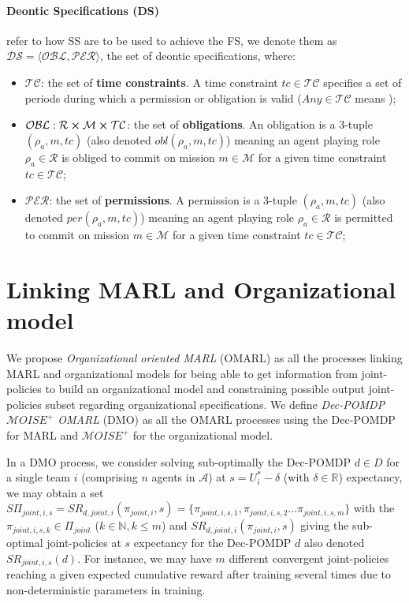 \documentclass[doubleblind]{ecai}
\begin{document}
\paragraph{\textbf{Deontic Specifications (DS)}} refer to how SS are to be used to achieve the FS, we denote them as $\mathcal{DS} = \langle \mathcal{OBL},\mathcal{PER} \rangle$, the set of deontic specifications, where:

\begin{itemize}
    \item $\mathcal{TC}$: the set of \textbf{time constraints}. A time constraint $tc \in \mathcal{TC}$ specifies a set of periods during which a permission or obligation is valid ($Any \in \mathcal{TC}$ means );
    \item $\mathcal{OBL}: \mathcal{R} \cross \mathcal{M} \cross \mathcal{TC}$: the set of \textbf{obligations}. An obligation is a 3-tuple $(\rho_a,m,tc)$ (also denoted $obl(\rho_a,m,tc)$) meaning an agent playing role $\rho_a \in \mathcal{R}$ is obliged to commit on mission $m \in \mathcal{M}$ for a given time constraint $tc \in \mathcal{TC}$;
    \item $\mathcal{PER}$: the set of \textbf{permissions}. A permission is a 3-tuple $(\rho_a,m,tc)$ (also denoted $per(\rho_a,m,tc)$) meaning an agent playing role $\rho_a \in \mathcal{R}$ is permitted to commit on mission $m \in \mathcal{M}$ for a given time constraint $tc \in \mathcal{TC}$;
\end{itemize}


\section{Linking MARL and Organizational model}

We propose \emph{Organizational oriented MARL} (OMARL) as all the processes linking MARL and organizational models for being able to get information from joint-policies to build an organizational model and constraining possible output joint-policies subset regarding organizational specifications. We define \emph{Dec-POMDP $\mathcal{M}OISE^+$ OMARL} (DMO) as all the OMARL processes using the Dec-POMDP for MARL and $\mathcal{M}OISE^+$ for the organizational model.

In a DMO process, we consider solving sub-optimally the Dec-POMDP $d \in D$ for a single team $i$ (comprising $n$ agents in $\mathcal{A}$) at $s = U_i^* - \delta$ (with $\delta \in \mathbb{R}$) expectancy, we may obtain a set $S\Pi_{joint,i,s} = SR_{d,joint,i}(\pi_{joint,i},s) = \{\pi_{joint,i,s,1}, \pi_{joint,i,s,2} ... \pi_{joint,i,s,m}\}$ with the $\pi_{joint,i,s,k} \in \Pi_{joint}$ ($k \in \mathbb{N}, k \leq m$) and $SR_{d,joint,i}(\pi_{joint,i},s)$ giving the sub-optimal joint-policies at $s$ expectancy for the Dec-POMDP $d$ also denoted $SR_{joint,i,s}(d)$. For instance, we may have $m$ different convergent joint-policies reaching a given expected cumulative reward after training several times due to non-deterministic parameters in training.
\end{document}
